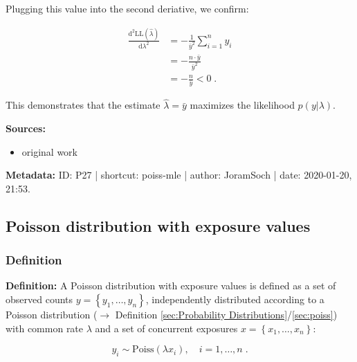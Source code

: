 \documentclass[a4paper,12pt,twoside]{book}
\begin{document}
Plugging this value into the second deriative, we confirm:

\begin{equation} \label{eq:poiss-mle-Poiss-d2LLdl2}
\begin{split}
\frac{\mathrm{d}^2\mathrm{LL}(\hat{\lambda})}{\mathrm{d}\lambda^2} &= -\frac{1}{\bar{y}^2} \sum_{i=1}^n y_i \\
&= -\frac{n \cdot \bar{y}}{\bar{y}^2} \\
&= -\frac{n}{\bar{y}} < 0 \; .
\end{split}
\end{equation}

This demonstrates that the estimate $\hat{\lambda} = \bar{y}$ maximizes the likelihood $p(y \vert \lambda)$.


\vspace{1em}
\textbf{Sources:}
\begin{itemize}
\item original work\end{itemize}


\vspace{1em}
\textbf{Metadata:} ID: P27 | shortcut: poiss-mle | author: JoramSoch | date: 2020-01-20, 21:53.
\vspace{1em}



\subsection{Poisson distribution with exposure values}

\subsubsection[\textit{Definition}]{Definition} \label{sec:poissexp}
\setcounter{equation}{0}

\textbf{Definition:} A Poisson distribution with exposure values is defined as a set of observed counts $y = \left\lbrace y_1, \ldots, y_n \right\rbrace$, independently distributed according to a Poisson distribution ($\rightarrow$ Definition \ref{sec:Probability Distributions}/\ref{sec:poiss}) with common rate $\lambda$ and a set of concurrent exposures $x = \left\lbrace x_1, \ldots, x_n \right\rbrace$:

\begin{equation} \label{eq:poissexp-Poiss-exp}
y_i \sim \mathrm{Poiss}(\lambda x_i), \quad i = 1, \ldots, n \; .
\end{equation}
\end{document}

